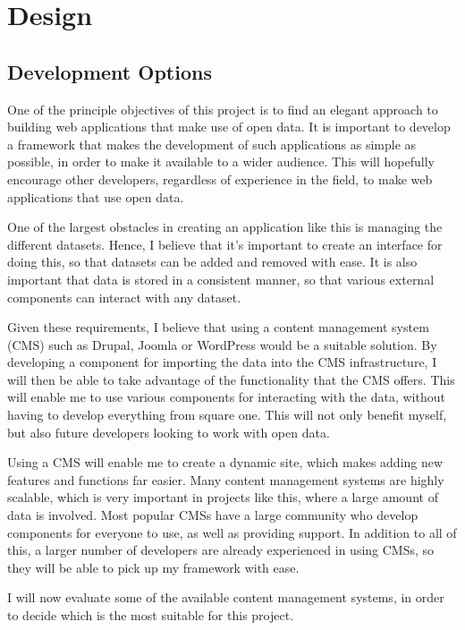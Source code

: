 \documentclass[authoryearcitations]{UoYCSproject}
\begin{document}
\chapter{Design}

\section{Development Options}
One of the principle objectives of this project is to find an elegant approach to building web applications that make use of open data. It is important to develop a framework that makes the development of such applications as simple as possible, in order to make it available to a wider audience. This will hopefully encourage other developers, regardless of experience in the field, to make web applications that use open data. 

One of the largest obstacles in creating an application like this is managing the different datasets. Hence, I believe that it’s important to create an interface for doing this, so that datasets can be added and removed with ease. It is also important that data is stored in a consistent manner, so that various external components can interact with any dataset.

Given these requirements, I believe that using a content management system (CMS) such as Drupal, Joomla or WordPress would be a suitable solution. By developing a component for importing the data into the CMS infrastructure, I will then be able to take advantage of the functionality that the CMS offers. This will enable me to use various components for interacting with the data, without having to develop everything from square one. This will not only benefit myself, but also future developers looking to work with open data. 

Using a CMS will enable me to create a dynamic site, which makes adding new features and functions far easier. Many content management systems are highly scalable, which is very important in projects like this, where a large amount of data is involved. Most popular CMSs have a large community who develop components for everyone to use, as well as providing support. In addition to all of this, a larger number of developers are already experienced in using CMSs, so they will be able to pick up my framework with ease. 

I will now evaluate some of the available content management systems, in order to decide which is the most suitable for this project.




\end{document}
